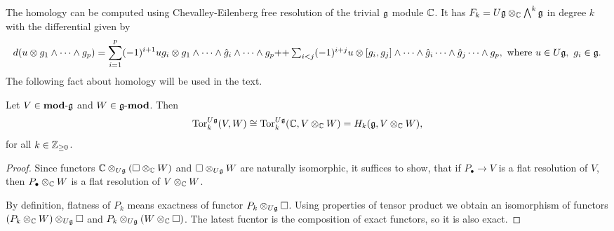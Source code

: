The homology can be computed using Chevalley-Eilenberg  free resolution of the trivial $\mathfrak{g}$
module $\mathbb{C}$. It has $F_k=U\mathfrak{g}\otimes_{\mathbb{C}} \bigwedge^k \mathfrak{g}$ in degree $k$ with the
differential given by
\begin{equation}
    d(u\otimes g_1 \wedge \cdots \wedge g_p) 
 = \sum_{i = 1}^p (-1)^{i+1} u g_i \otimes g_1 \wedge \cdots \wedge \hat{g}_i\wedge \cdots \wedge g_p  
+$$ $$+\sum_{i < j} (-1)^{i+j} u\otimes [g_i, g_j] \wedge \cdots \wedge \hat{g}_i\cdots \wedge
\hat{g}_j\cdots \wedge g_p,~\text{where } u\in U\lieg,~g_i \in \lieg.
\end{equation}
The following fact about homology will be used in the text.
\begin{theorem}
   Let $V \in \operatorname{\mathbf{mod-\mathfrak{g}}}$ and $W \in \operatorname{\mathbf{\mathfrak{g}-mod}}$. Then  
    \[
        \mathrm{Tor}_k^{U\mathfrak{g}}(V,W) \cong \mathrm{Tor}_k^{U\mathfrak{g}}(\mathbb{C},V\otimes_{\mathbb{C}} W) = H_k(\mathfrak{g}, V\otimes_{\mathbb{C}} W),
    \]
    for all $k\in \mathbb{Z}_{\geq 0}$.
\end{theorem}
\begin{proof}
    Since functors $\mathbb{C}\otimes_{U\mathfrak{g}}(\square \otimes_{\mathbb{C}} W)$ and $\square \otimes_{U\mathfrak{g}} W$
    are naturally isomorphic, it suffices to show, that if $P_\bullet \to V$ is a flat
    resolution of $V$, then $P_\bullet \otimes_{\mathbb{C}} W$ is a flat resolution of $V\otimes_{\mathbb{C}}
    W$.

    By definition, flatness of $P_k$ means exactness of functor $P_k\otimes_{U\mathfrak{g}}\square$. Using
    properties of tensor product we obtain an isomorphism of functors $(P_k\otimes_{\mathbb{C}} W) 
    \otimes_{U\mathfrak{g}} \square$ and $P_k\otimes_{U\mathfrak{g}} (W \otimes_{\mathbb{C}} \square)$. The latest fucntor
    is the composition of exact functors, so it is also exact.

    
\end{proof}
